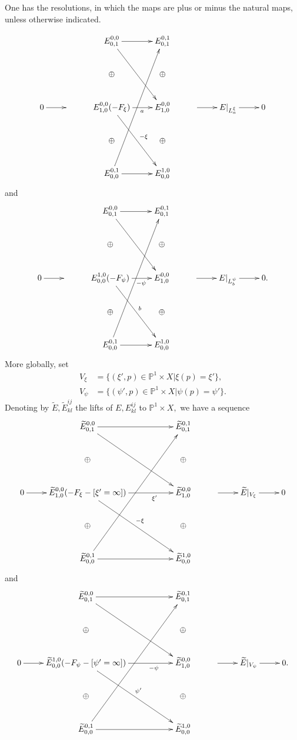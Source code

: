 \documentclass[12pt]{article}
\theoremstyle{definition}
\theoremstyle{remark}
\numberwithin{theorem}{section}
\def\bP{{\mathbb {P}}}
\begin{document}
 One has the resolutions, in which the maps are plus or minus the natural maps, unless otherwise indicated.
 
  \begin{equation}\label{TN-resolution-2}
  \xymatrix{ 
  & &E_{0,1}^{0,0} \ar[r]\ar[ddr] &E_{0,1}^{0,1}\\
  &&\oplus&\oplus \\
   0 \ar[r]  & &E_{1,0}^{0,0} (-F_\xi)  \ar[r]_(0.6){a } \ar[ddr]^{-\xi}&E_{1,0}^{0,0}&\ar[r]&E|_{L^\xi_{a}} \ar[r]&0\\
     &&\oplus&\oplus \\
   &&E_{0,0}^{0,1}  \ar[r]\ar[uuuur] &E_{0,0}^{1,0}} \end{equation}
 and
   \begin{equation}\label{TN-resolution-3}\xymatrix{ 
  & &E_{0,1}^{0,0} \ar[r]\ar[ddr] &E_{0,1}^{0,1}\\
  &&\oplus&\oplus \\
      0\ar[r]& &E_{0,0}^{1,0}(-F_\psi)\ar[r]_(0.6){-\psi}\ar[ddr]^(0.5){b}&E_{1,0}^{0,0}&\ar[r]&E|_{L^\psi_{b}} \ar[r]&0.\\
     &&\oplus&\oplus \\
   &&E_{0,0}^{0,1}  \ar[r]\ar[uuuur] &E_{0,0}^{1,0}
} 
\end{equation}
More globally, set
 \begin{align}
 V_\xi &=\{(\xi',p)\in \bP^1 \times X| \xi(p)= \xi'\}, \\
  V_\psi &=\{( \psi',p)\in \bP^1 \times X| \psi(p)= \psi'\}.
 \end{align}
 Denoting by $\widetilde E, \widetilde E^{ij}_{kl}$ the lifts of $ E,  E^{ij}_{kl}$ to $\bP^1 \times X,$ we have  a sequence 
\begin{equation}\label{TN-resolution-4}\xymatrix{ 
  & \widetilde E_{0,1}^{0,0} \ar[rr]\ar[ddrr] &&\widetilde E_{0,1}^{0,1}\\
  &\oplus&&\oplus \\
0 \ar[r]  & \widetilde E^{0,0}_{1,0}(-F_\xi-[\xi'=\infty])  \ar[rr]_(0.7){\xi'} \ar[ddrr]^{-\xi}&&\widetilde E_{1,0}^{0,0}&\ar[r]&\widetilde E|_{V_\xi } \ar[r]&0\\
     &\oplus&&\oplus \\
   &\widetilde E_{0,0}^{0,1}  \ar[rr]\ar[uuuurr] &&\widetilde E_{0,0}^{1,0}} \end{equation}
 and
\begin{equation}\label{TN-resolution-5}\xymatrix{ 
  & \widetilde E_{0,1}^{0,0} \ar[rr]\ar[ddrr] &&\widetilde E_{0,1}^{0,1}\\
  &\oplus&&\oplus \\
      0\ar[r]& \widetilde E^{1,0}_{0,0}(-F_\psi-[\psi'=\infty])\ar[rr]_(0.7){-\psi} \ar[rrdd]^(0.5){ \psi'}&&\widetilde E_{1,0}^{0,0}&\ar[r]&\widetilde E|_{V_\psi} \ar[r]&0.\\
     &\oplus&&\oplus \\
   &\widetilde E_{0,0}^{0,1}  \ar[rr]\ar[uuuurr] &&\widetilde E_{0,0}^{1,0}} \end{equation}
 
\end{document}
